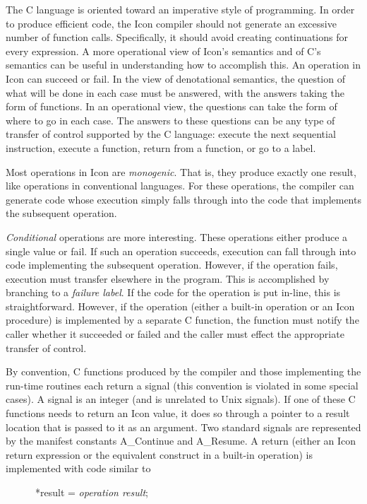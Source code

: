 The C language is oriented toward an imperative style of
programming. In order to produce efficient code, the Icon compiler
should not generate an excessive number of function
calls. Specifically, it should avoid creating continuations for every
expression. A more operational view of Icon's semantics and of C's
semantics can be useful in understanding how to accomplish this. An
operation in Icon can succeed or fail. In the view of denotational
semantics, the question of what will be done in each case must be
answered, with the answers taking the form of functions. In an
operational view, the questions can take the form of where to go in
each case. The answers to these questions can be any type of transfer
of control supported by the C language: execute the next sequential
instruction, execute a function, return from a function, or go to a
label.

Most operations in Icon are \textit{monogenic}. That is, they produce
exactly one result, like operations in conventional languages. For
these operations, the compiler can generate code whose execution
simply falls through into the code that implements the subsequent
operation.

\textit{Conditional} operations are more interesting. These operations
either produce a single value or fail. If such an operation succeeds,
execution can fall through into code implementing the subsequent
operation. However, if the operation fails, execution must transfer
elsewhere in the program. This is accomplished by branching to a
\textit{failure label}. If the code for the operation is put in-line,
this is straightforward. However, if the operation (either a built-in
operation or an Icon procedure) is implemented by a separate C
function, the function must notify the caller whether it succeeded or
failed and the caller must effect the appropriate transfer of control.

By convention, C functions produced by the compiler and those
implementing the run-time routines each return a signal (this
convention is violated in some special cases). A signal is an integer
(and is unrelated to Unix signals). If one of these C functions needs
to return an Icon value, it does so through a pointer to a result
location that is passed to it as an argument. Two standard signals are
represented by the manifest constants A\_Continue and A\_Resume. A
return (either an Icon return expression or the equivalent construct
in a built-in operation) is implemented with code similar to

{\ttfamily\mdseries
\ \ \ \ \ \ *result = \textit{operation result};}

